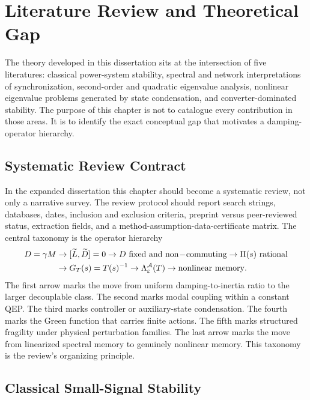 \chapter{Literature Review and Theoretical Gap}

The theory developed in this dissertation sits at the intersection of five
literatures: classical power-system stability, spectral and network
interpretations of synchronization, second-order and quadratic eigenvalue
analysis, nonlinear eigenvalue problems generated by state condensation, and
converter-dominated stability. The purpose of this chapter is not to catalogue
every contribution in those areas. It is to identify the exact conceptual gap
that motivates a damping-operator hierarchy.

\section{Systematic Review Contract}

In the expanded dissertation this chapter should become a systematic review,
not only a narrative survey. The review protocol should report search strings,
databases, dates, inclusion and exclusion criteria, preprint versus
peer-reviewed status, extraction fields, and a method-assumption-data-certificate
matrix. The central taxonomy is the operator hierarchy
\begin{equation}
  \begin{aligned}
  D=\gamma M
  &\rightarrow
  [\widetilde L,\widetilde D]=0
  \rightarrow
  D\ {\rm fixed\ and\ non\!-\!commuting}
  \rightarrow
  \Pi(s)\ {\rm rational} \\
  &\rightarrow
  G_T(s)=T(s)^{-1}
  \rightarrow
  \Lambda_\varepsilon^{\mathcal A}(T)
  \rightarrow
  {\rm nonlinear\ memory}.
  \end{aligned}
  \label{eq:lit_operator_taxonomy}
\end{equation}
The first arrow marks the move from uniform damping-to-inertia ratio to the
larger decouplable class. The second marks modal coupling within a constant
QEP. The third marks controller or auxiliary-state condensation. The fourth
marks the Green function that carries finite actions. The fifth marks
structured fragility under physical perturbation families. The last arrow
marks the move from linearized spectral memory to genuinely nonlinear memory.
This taxonomy is the review's organizing principle.

\section{Classical Small-Signal Stability}

